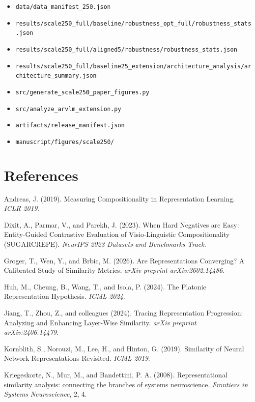 \documentclass[11pt,a4paper]{article}
\providecommand{\tightlist}{%
  \setlength{\itemsep}{0pt}\setlength{\parskip}{0pt}}
\begin{document}
\begin{itemize}
\tightlist
\item
  \texttt{data/data\_manifest\_250.json}
\item
  \texttt{results/scale250\_full/baseline/robustness\_opt\_full/robustness\_stats.json}
\item
  \texttt{results/scale250\_full/aligned5/robustness/robustness\_stats.json}
\item
  \texttt{results/scale250\_full/baseline25\_extension/architecture\_analysis/architecture\_summary.json}
\item
  \texttt{src/generate\_scale250\_paper\_figures.py}
\item
  \texttt{src/analyze\_arvlm\_extension.py}
\item
  \texttt{artifacts/release\_manifest.json}
\item
  \texttt{manuscript/figures/scale250/}
\end{itemize}

\section{References}\label{references}

Andreas, J. (2019). Measuring Compositionality in Representation
Learning. \emph{ICLR 2019}.

Dixit, A., Parmar, V., and Parekh, J. (2023). When Hard Negatives are
Easy: Entity-Guided Contrastive Evaluation of Visio-Linguistic
Compositionality (SUGARCREPE). \emph{NeurIPS 2023 Datasets and
Benchmarks Track}.

Groger, T., Wen, Y., and Brbic, M. (2026). Are Representations
Converging? A Calibrated Study of Similarity Metrics. \emph{arXiv
preprint arXiv:2602.14486}.

Huh, M., Cheung, B., Wang, T., and Isola, P. (2024). The Platonic
Representation Hypothesis. \emph{ICML 2024}.

Jiang, T., Zhou, Z., and colleagues (2024). Tracing Representation
Progression: Analyzing and Enhancing Layer-Wise Similarity. \emph{arXiv
preprint arXiv:2406.14479}.

Kornblith, S., Norouzi, M., Lee, H., and Hinton, G. (2019). Similarity
of Neural Network Representations Revisited. \emph{ICML 2019}.

Kriegeskorte, N., Mur, M., and Bandettini, P. A. (2008).
Representational similarity analysis: connecting the branches of systems
neuroscience. \emph{Frontiers in Systems Neuroscience}, 2, 4.
\end{document}
